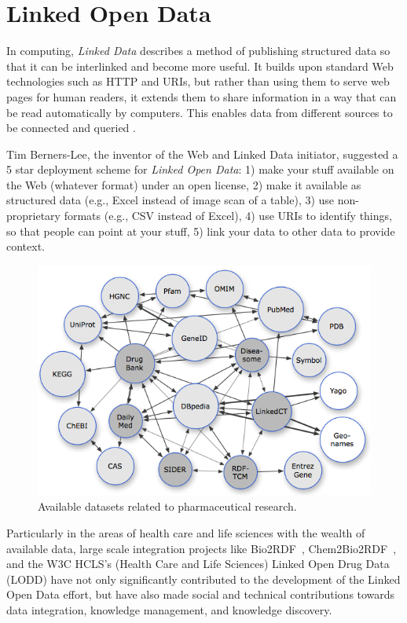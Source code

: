 \documentclass[10pt, conference, compsocconf]{IEEEtran}
\begin{document}
\section{Linked Open Data}
\label{sec:lod}
In computing, \emph{Linked Data} describes a method of publishing structured data so that it can be interlinked and become more useful.
It builds upon standard Web technologies such as HTTP and URIs, but rather than using them to serve web pages for human readers, it extends them to share information in a way that can be read automatically by computers.
This enables data from different sources to be connected and queried \cite{linkeddata}.

Tim Berners-Lee, the inventor of the Web and Linked Data initiator, suggested a 5 star deployment scheme for \emph{Linked Open Data}:
1) make your stuff available on the Web (whatever format) under an open license,
2) make it available as structured data (e.g., Excel instead of image scan of a table),
3) use non-proprietary formats (e.g., CSV instead of Excel),
4) use URIs to identify things, so that people can point at your stuff,
5) link your data to other data to provide context.

\begin{figure}[tb]
	\centering
		\includegraphics[width=1.0\columnwidth]{images/lod_cloud.png}
	\caption{Available datasets related to pharmaceutical research.}
	\label{fig:lod}
\end{figure}

Particularly in the areas of health care and life sciences with the wealth of available data, large scale integration projects like Bio2RDF~\cite{bio2rdf}, Chem2Bio2RDF~\cite{chembio}, and the W3C HCLS’s (Health Care and Life Sciences) Linked Open Drug Data (LODD)\cite{lodd} have not only significantly contributed to the development of the Linked Open Data effort, but have also made social and technical contributions towards data integration, knowledge management, and knowledge discovery.
\end{document}
